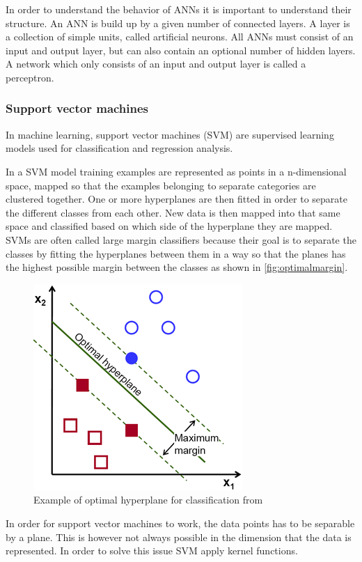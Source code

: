 In order to understand the behavior of ANNs it is important to understand their structure. An ANN is build up by a given number of connected layers. A layer is a collection of simple units, called artificial neurons. All ANNs must consist of an input and output layer, but can also contain an optional number of hidden layers. A network which only consists of an input and output layer is called a perceptron.

\subsubsection*{Support vector machines}
In machine learning, support vector machines (SVM) are supervised learning models used for classification and regression analysis.

In a SVM model training examples are represented as points in a n-dimensional space, mapped so that the examples belonging to separate categories are clustered together. One or more hyperplanes are then fitted in order to separate the different classes from each other. New data is then mapped into that same space and classified based on which side of the hyperplane they are mapped. SVMs are often called large margin classifiers because their goal is to separate the classes by fitting the hyperplanes between them in a way so that the planes has the highest possible margin between the classes as shown in \autoref{fig:optimalmargin}.

\begin{figure}[!h]
	\centering
	\includegraphics[scale=2.5]{fig/optimal-hyperplane.png}
	\caption{Example of optimal hyperplane for classification from \cite{Opencv2017}}
	\label{fig:optimalmargin}
\end{figure}

In order for support vector machines to work, the data points has to be separable by a plane. This is however not always possible in the dimension that the data is represented. In order to solve this issue SVM apply kernel functions.

